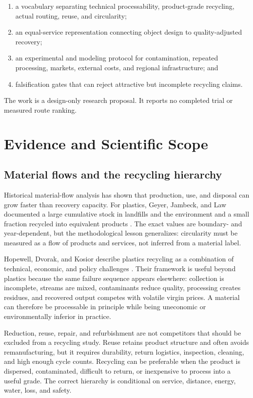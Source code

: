 \documentclass[conference]{IEEEtran}
\begin{document}
\begin{enumerate}
\item a vocabulary separating technical processability, product-grade recycling, actual routing, reuse, and circularity;
\item an equal-service representation connecting object design to quality-adjusted recovery;
\item an experimental and modeling protocol for contamination, repeated processing, markets, external costs, and regional infrastructure; and
\item falsification gates that can reject attractive but incomplete recycling claims.
\end{enumerate}

The work is a design-only research proposal. It reports no completed trial or measured route ranking.

\section{Evidence and Scientific Scope}

\subsection{Material flows and the recycling hierarchy}

Historical material-flow analysis has shown that production, use, and disposal can grow faster than recovery capacity. For plastics, Geyer, Jambeck, and Law documented a large cumulative stock in landfills and the environment and a small fraction recycled into equivalent products \cite{geyer}. The exact values are boundary- and year-dependent, but the methodological lesson generalizes: circularity must be measured as a flow of products and services, not inferred from a material label.

Hopewell, Dvorak, and Kosior describe plastics recycling as a combination of technical, economic, and policy challenges \cite{hopewell}. Their framework is useful beyond plastics because the same failure sequence appears elsewhere: collection is incomplete, streams are mixed, contaminants reduce quality, processing creates residues, and recovered output competes with volatile virgin prices. A material can therefore be processable in principle while being uneconomic or environmentally inferior in practice.

Reduction, reuse, repair, and refurbishment are not competitors that should be excluded from a recycling study. Reuse retains product structure and often avoids remanufacturing, but it requires durability, return logistics, inspection, cleaning, and high enough cycle counts. Recycling can be preferable when the product is dispersed, contaminated, difficult to return, or inexpensive to process into a useful grade. The correct hierarchy is conditional on service, distance, energy, water, loss, and safety.
\end{document}
